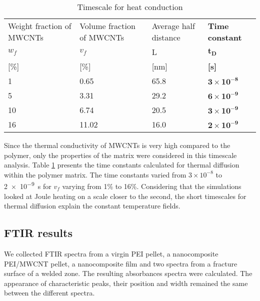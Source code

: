 \begin{table}[htb]
	\centering
	\caption{Timescale for heat conduction}
	\begin{tabular}{@{}p{2.8cm}p{3.0cm}p{2.2cm}p{3.2cm}@{}}
		\toprule
		Weight fraction of MWCNTs & Volume fraction of MWCNTs & Average half distance & \textbf{Time constant}     \\
		$w_f$                     & $v_f$                     & L                     & $\mathbf{t_D}$             \\
		{[}\%{]}                  & {[}\%{]	}                 & {[}nm{]}              & \textbf{{[}s{]}}           \\ \midrule
		1                         & 0.65                      & 65.8                  & $\mathbf{3\times 10^{-8}}$ \\
		5                         & 3.31                      & 29.2                  & $\mathbf{6\times 10^{-9}}$ \\
		10                        & 6.74                      & 20.5                  & $\mathbf{3\times 10^{-9}}$ \\
		16                        & 11.02                     & 16.0                  & $\mathbf{2\times 10^{-9}}$ \\ \bottomrule
	\end{tabular}
	\label{tab:results_timescale}
\end{table}

Since the thermal conductivity of MWCNTs is very high compared to the polymer, only the properties of the matrix were considered in this timescale analysis. 
Table \ref{tab:results_timescale} presents the time constants calculated for thermal diffusion within the polymer matrix. 
The time constants varied from $3 \times 10^{-8}$ to \SI{2e-9}{\second} for $v_f$ varying from 1\% to 16\%. 
Considering that the simulations looked at Joule heating on a scale closer to the second, the short timescales for thermal diffusion explain the constant temperature fields. 

\subsection*{FTIR results}

We collected FTIR spectra from a virgin PEI pellet, a nanocomposite PEI/MWCNT pellet, a nanocomposite film and two spectra from a fracture surface of a welded zone. 
The resulting absorbances spectra were calculated. 
The appearance of characteristic peaks, their position and width remained the same between the different spectra. 

